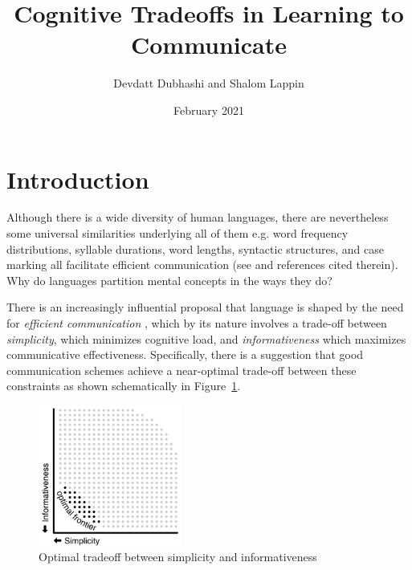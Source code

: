 \documentclass{article}
\title{Cognitive Tradeoffs in Learning to Communicate}
\author{Devdatt Dubhashi and Shalom Lappin}
\date{February 2021}
\begin{document}
\maketitle

\section{Introduction}
Although there is a wide diversity of human languages, there are nevertheless some universal similarities underlying all of them e.g. word frequency distributions, syllable durations, word lengths, syntactic structures, and case marking all facilitate efficient communication (see \cite{Regier2015} and references cited therein). Why do languages partition mental concepts in the ways they do?

There is an increasingly influential proposal that language is shaped by the need for \emph{efficient communication} \cite{Kemp2018}, which by its nature involves a trade-off between \emph{simplicity}, which minimizes cognitive load, and \emph{informativeness} which maximizes communicative effectiveness. Specifically, there is a suggestion that good communication schemes achieve a near-optimal trade-off between these constraints as shown schematically in Figure~\ref{fig:opt}.
\begin{figure}
    \centering
    \includegraphics[width=0.42\textwidth]{Figures/fig_optimal_frontier.png}
    \caption{Optimal tradeoff between simplicity and informativeness}
    \label{fig:opt}
\end{figure}
\end{document}
